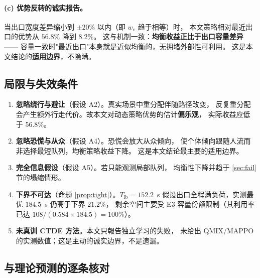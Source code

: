 \paragraph{(c) 优势反转的诚实报告。}
当出口宽度差异缩小到 $\pm20\%$ 以内（即 $w_e$ 趋于相等）时，
本文策略相对最近出口的优势从 $56.8\%$ 降到 $8.2\%$。
这与机制一致：\textbf{均衡收益正比于出口容量差异}——
容量一致时"最近出口"本身就是近似均衡的，无拥堵外部性可利用。
这是本文结论的\textbf{适用边界}，不隐瞒。

\subsection{局限与失效条件}
\label{sec:limitation}

\begin{csflimit}
\begin{enumerate}
  \item \textbf{忽略绕行与避让}（假设 A2）。真实场景中重分配伴随路径改变，
        反复重分配会产生额外行走代价。故本文对动态策略优势的估计\textbf{偏乐观}，
        实际收益应低于 $56.8\%$。
  \item \textbf{忽略恐慌与从众}（假设 A4）。恐慌会放大从众倾向，
        使个体倾向跟随人流而非选择最短队列，均衡策略收益下降。
        这是本文结论最主要的适用边界。
  \item \textbf{完全信息假设}（假设 A5）。若只能观测局部队列，
        均衡性下降并趋于 \ref{sec:fail} 节的塌缩情形。
  \item \textbf{下界不可达}（命题 \ref{prop:tight}）。$T_{\mathrm{lb}}=152.2$~s
        假设出口全程满负荷，实测最优 $184.5$~s 仍高于下界 $21.2\%$，
        剩余空间主要受 E3 容量份额限制（其利用率已达 $108/(0.584\times184.5)=100\%$）。
  \item \textbf{未真训 CTDE 方法}。本文只報告独立学习的失败，
        未给出 QMIX/MAPPO 的实测数值；这是主动的诚实边界，不是遗漏。
\end{enumerate}
\end{csflimit}

\subsection{与理论预测的逐条核对}
\label{sec:verify}

